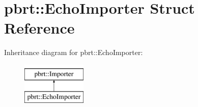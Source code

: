 \hypertarget{structpbrt_1_1_echo_importer}{}\section{pbrt\+:\+:Echo\+Importer Struct Reference}
\label{structpbrt_1_1_echo_importer}
Inheritance diagram for pbrt\+:\+:Echo\+Importer\+:\begin{figure}[H]
\begin{center}
\leavevmode
\includegraphics[height=2.000000cm]{structpbrt_1_1_echo_importer}
\end{center}
\end{figure}
